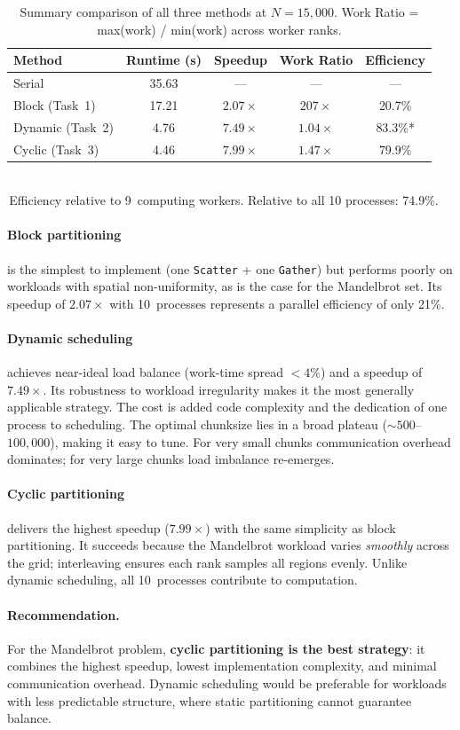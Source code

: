 \documentclass[11pt,a4paper]{article}
\begin{document}
\begin{table}[h]\centering
\begin{tabular}{@{}lcccc@{}}
\toprule
Method & Runtime (s) & Speedup & Work Ratio & Efficiency \\
\midrule
Serial               & 35.63 & ---           & ---           & --- \\
Block (Task~1)       & 17.21 & $2.07\times$  & $207\times$   & 20.7\% \\
Dynamic (Task~2)     &  4.76 & $7.49\times$  & $1.04\times$  & 83.3\%* \\
Cyclic (Task~3)      &  4.46 & $7.99\times$  & $1.47\times$  & 79.9\% \\
\bottomrule
\end{tabular}\\[4pt]
{\footnotesize *\,Efficiency relative to 9~computing workers.
Relative to all 10 processes: 74.9\%.}
\caption{Summary comparison of all three methods at $N = 15{,}000$.
Work Ratio = max(work) / min(work) across worker ranks.}
\label{tab:summary}
\end{table}

\paragraph{Block partitioning} is the simplest to implement (one
\texttt{Scatter} + one \texttt{Gather}) but performs poorly on workloads
with spatial non-uniformity, as is the case for the Mandelbrot set. Its
speedup of $2.07\times$ with 10~processes represents a parallel efficiency
of only 21\%.

\paragraph{Dynamic scheduling} achieves near-ideal load balance (work-time
spread $< 4\%$) and a speedup of $7.49\times$. Its robustness to workload
irregularity makes it the most generally applicable strategy. The cost is
added code complexity and the dedication of one process to scheduling. The
optimal chunksize lies in a broad plateau ($\sim 500$--$100{,}000$), making
it easy to tune. For very small chunks communication overhead dominates; for
very large chunks load imbalance re-emerges.

\paragraph{Cyclic partitioning} delivers the highest speedup
($7.99\times$) with the same simplicity as block partitioning. It succeeds
because the Mandelbrot workload varies \emph{smoothly} across the grid;
interleaving ensures each rank samples all regions evenly. Unlike dynamic
scheduling, all 10~processes contribute to computation.

\paragraph{Recommendation.} For the Mandelbrot problem, \textbf{cyclic
partitioning is the best strategy}: it combines the highest speedup, lowest
implementation complexity, and minimal communication overhead. Dynamic
scheduling would be preferable for workloads with less predictable
structure, where static partitioning cannot guarantee balance.
\end{document}
